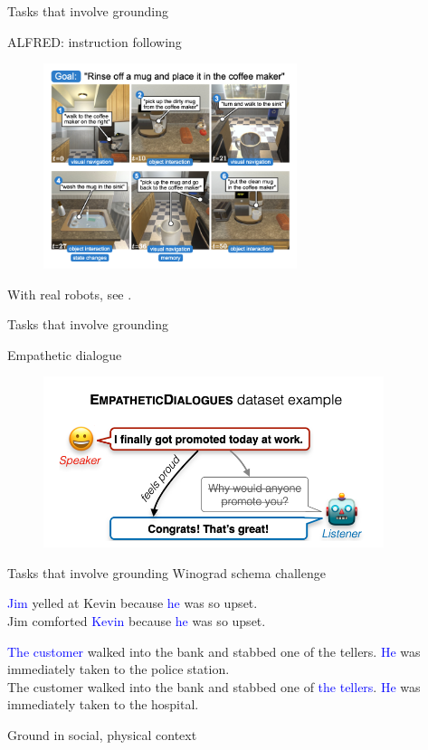 \documentclass[usenames,dvipsnames,notes]{beamer}
\begin{document}
\begin{frame}
    {Tasks that involve grounding}

    ALFRED: instruction following \mycite{[Shridhar+ 2020]}
    \vspace{-1em}
    \begin{figure}
        \includegraphics[height=6cm]{figures/alfred}
    \end{figure}

    With real robots, see \mycite{[Chai+ 2018]}.
\end{frame}

\begin{frame}
    {Tasks that involve grounding}

    Empathetic dialogue \mycite{[Rashkin+ 2020]}
    \vspace{-1em}
    \begin{figure}
        \includegraphics[height=5cm]{figures/empathetic}
    \end{figure}
\end{frame}

\begin{frame}
    {Tasks that involve grounding}
    Winograd schema challenge 

    \textcolor{blue}{Jim} yelled at Kevin because \textcolor{blue}{he} was so upset.\\
    Jim comforted \textcolor{blue}{Kevin} because \textcolor{blue}{he} was so upset.

    \bigskip
    \textcolor{blue}{The customer} walked into the bank and stabbed one of the tellers. \textcolor{blue}{He} was immediately taken to the police station.\\
    The customer walked into the bank and stabbed one of \textcolor{blue}{the tellers}. \textcolor{blue}{He} was immediately taken to the hospital.

    \bigskip
    Ground in social, physical context
\end{frame}
\end{document}
